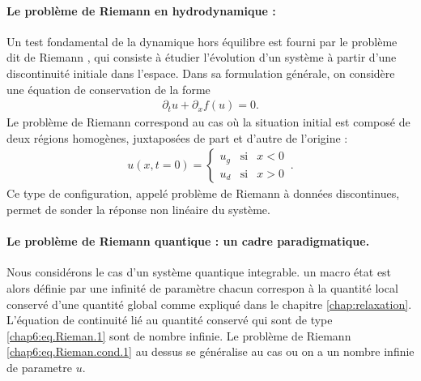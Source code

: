 \paragraph{Le problème de Riemann en hydrodynamique :}
Un test fondamental de la dynamique hors équilibre est fourni par le problème dit de Riemann \cite{Riemann1860,Bressan2013}, qui consiste à étudier l’évolution d’un système à partir d'une discontinuité initiale dans l'espace. Dans sa formulation générale, on considère une équation de conservation de la forme
\begin{eqnarray}\label{chap6:eq.Rieman.1}
\partial_t u + \partial_x f(u) = 0.
\end{eqnarray}
Le problème de Riemann correspond au cas où la situation initial est composé de deux régions homogènes, juxtaposées de part et d’autre de l’origine :
\begin{eqnarray}\label{chap6:eq.Rieman.cond.1}
	u( x, t=0 ) = \left \{\begin{array}{rcl} u_g & \text{si} & x<0 \\ u_d & \text{si} & x > 0 \end{array} \right. \,.
\end{eqnarray}
Ce type de configuration, appelé problème de Riemann à données discontinues, permet de sonder la réponse non linéaire du système.

\paragraph{Le problème de Riemann quantique : un cadre paradigmatique.}

Nous considérons le cas d'un système quantique integrable. un macro état est alors définie par une infinité de paramètre chacun correspon à la quantité local conservé d'une quantité global comme expliqué dans le chapitre \ref{chap:relaxation}.
L'équation de continuité lié au quantité conservé qui sont de type \eqref{chap6:eq.Rieman.1} sont de nombre infinie. Le problème de Riemann \eqref{chap6:eq.Rieman.cond.1} au dessus se généralise au cas ou on a un nombre infinie de parametre $u$.

